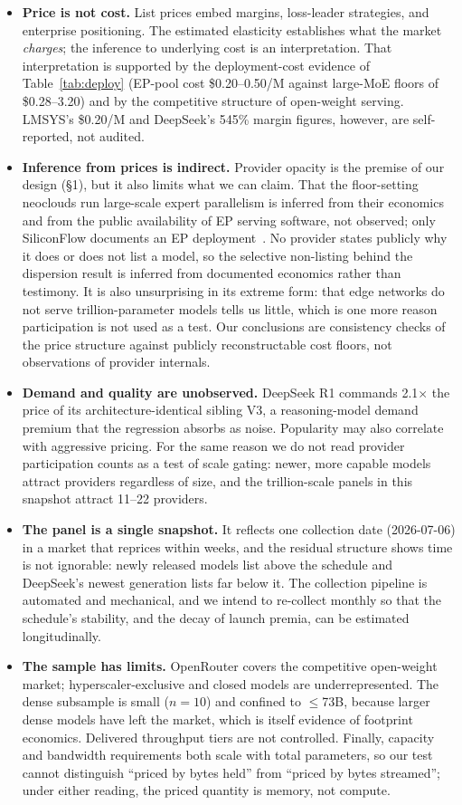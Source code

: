 \documentclass[11pt]{article}
\begin{document}
\begin{itemize}
\item \textbf{Price is not cost.} List prices embed margins, loss-leader
strategies, and enterprise positioning. The estimated elasticity establishes what the market \emph{charges}; the inference to underlying cost is an interpretation. That interpretation is supported by the deployment-cost evidence of Table~\ref{tab:deploy} (EP-pool cost \$0.20--0.50/M against large-MoE floors of \$0.28--3.20) and by the competitive structure of open-weight serving. LMSYS's \$0.20/M and DeepSeek's 545\% margin figures, however, are self-reported, not audited.
\item \textbf{Inference from prices is indirect.} Provider opacity is the
premise of our design (\S1), but it also limits what we can claim. That the
floor-setting neoclouds run large-scale expert parallelism is inferred from
their economics and from the public availability of EP serving software, not
observed; only SiliconFlow documents an EP deployment~\cite{r14}. No provider
states publicly why it does or does not list a model, so the selective
non-listing behind the dispersion result is inferred from documented
economics rather than testimony. It is also unsurprising in its extreme
form: that edge networks do not serve trillion-parameter models tells us
little, which is one more reason participation is not used as a test. Our conclusions are
consistency checks of the price structure against publicly reconstructable
cost floors, not observations of provider internals.
\item \textbf{Demand and quality are unobserved.} DeepSeek R1 commands
2.1$\times$ the price of its architecture-identical sibling V3, a
reasoning-model demand premium that the regression absorbs as noise.
Popularity may also correlate with aggressive pricing. For the same reason
we do not read provider participation counts as a test of scale gating:
newer, more capable models attract providers regardless of size, and the
trillion-scale panels in this snapshot attract 11--22 providers.
\item \textbf{The panel is a single snapshot.} It reflects one collection
date (2026-07-06) in a market that reprices within weeks, and the residual
structure shows time is not ignorable: newly released models list above the
schedule and DeepSeek's newest generation lists far below it. The collection
pipeline is automated and mechanical, and we intend to re-collect monthly so
that the schedule's stability, and the decay of launch premia, can be
estimated longitudinally.
\item \textbf{The sample has limits.} OpenRouter covers the competitive
open-weight market; hyperscaler-exclusive and closed models are
underrepresented. The
dense subsample is small ($n = 10$) and confined to $\leq$73B, because larger
dense models have left the market, which is itself evidence of footprint
economics. Delivered throughput tiers are not controlled. Finally, capacity
and bandwidth requirements both scale with total parameters, so our test
cannot distinguish ``priced by bytes held'' from ``priced by bytes streamed'';
under either reading, the priced quantity is memory, not compute.
\end{itemize}
\end{document}
